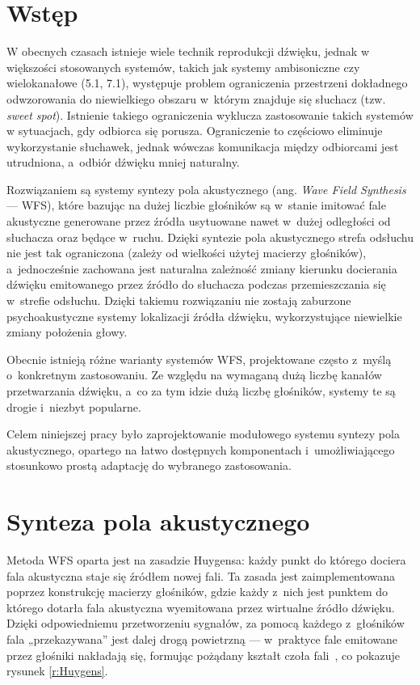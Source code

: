 \documentclass[10pt, a4paper]{article}
\let\Oldsection\section
\renewcommand{\section}{\FloatBarrier\Oldsection}
\begin{document}
\section{Wstęp}

W obecnych czasach istnieje wiele technik reprodukcji dźwięku, jednak w~
większości stosowanych systemów, takich jak systemy ambisoniczne czy
wielokanałowe (5.1, 7.1), występuje problem ograniczenia przestrzeni dokładnego
odwzorowania do niewielkiego obszaru w~którym znajduje się słuchacz (tzw.
\textit{sweet spot}). Istnienie takiego ograniczenia wyklucza zastosowanie 
takich systemów w sytuacjach, gdy odbiorca się porusza. Ograniczenie to częściowo
eliminuje wykorzystanie słuchawek, jednak wówczas komunikacja między odbiorcami
jest utrudniona, a~odbiór dźwięku mniej naturalny.

Rozwiązaniem są systemy syntezy pola akustycznego (ang.
\textit{Wave Field Synthesis} --- WFS), które bazując na dużej liczbie
głośników są w~stanie imitować fale akustyczne generowane przez źródła
usytuowane nawet w~dużej odległości od słuchacza oraz będące w~ruchu. Dzięki syntezie pola
akustycznego strefa odsłuchu nie jest tak ograniczona (zależy od wielkości użytej
macierzy głośników), a~jednocześnie zachowana jest naturalna zależność zmiany
kierunku docierania dźwięku emitowanego przez źródło do słuchacza podczas
przemieszczania się w~strefie odsłuchu. Dzięki takiemu rozwiązaniu nie zostają
zaburzone psychoakustyczne systemy lokalizacji źródła dźwięku, wykorzystujące
niewielkie zmiany położenia głowy. 

Obecnie istnieją różne warianty systemów WFS, projektowane często z~myślą 
o~konkretnym zastosowaniu. Ze względu na wymaganą dużą liczbę kanałów 
przetwarzania dźwięku, a~co za tym idzie dużą liczbę głośników, systemy te 
są drogie i~niezbyt popularne. 

Celem niniejszej pracy było zaprojektowanie modułowego systemu syntezy pola
akustycznego, opartego na łatwo dostępnych komponentach i~umożliwiającego
stosunkowo prostą adaptację do wybranego zastosowania.

\section{Synteza pola akustycznego}

Metoda WFS oparta jest na zasadzie Huygensa: każdy punkt do którego dociera
fala akustyczna staje się źródłem nowej fali. Ta zasada jest zaimplementowana
poprzez konstrukcję macierzy głośników, gdzie każdy z~nich jest punktem do
którego dotarła fala akustyczna wyemitowana przez wirtualne źródło dźwięku.
Dzięki odpowiedniemu przetworzeniu sygnałów, za pomocą każdego z~głośników fala
„przekazywana” jest dalej drogą powietrzną --- w~praktyce fale emitowane przez
głośniki nakładają się, formując pożądany kształt czoła
fali~\cite{hq_rendering}, co pokazuje rysunek
\ref{r:Huygens}.
\end{document}
